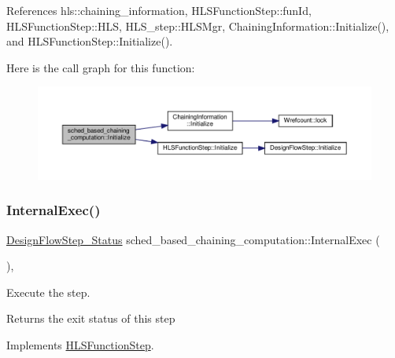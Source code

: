 References hls\+::chaining\+\_\+information, H\+L\+S\+Function\+Step\+::fun\+Id, H\+L\+S\+Function\+Step\+::\+H\+LS, H\+L\+S\+\_\+step\+::\+H\+L\+S\+Mgr, Chaining\+Information\+::\+Initialize(), and H\+L\+S\+Function\+Step\+::\+Initialize().

Here is the call graph for this function\+:
\nopagebreak
\begin{figure}[H]
\begin{center}
\leavevmode
\includegraphics[width=350pt]{d7/d8d/classsched__based__chaining__computation_a86daa9b72e0e2d9a939e80aa22055d4e_cgraph}
\end{center}
\end{figure}
\mbox{\label{classsched__based__chaining__computation_a9318a49e9ae291770e05f12c7dae246c}} 
\subsubsection{\texorpdfstring{Internal\+Exec()}{InternalExec()}}
{\footnotesize\ttfamily \hyperlink{design__flow__step_8hpp_afb1f0d73069c26076b8d31dbc8ebecdf}{Design\+Flow\+Step\+\_\+\+Status} sched\+\_\+based\+\_\+chaining\+\_\+computation\+::\+Internal\+Exec (\begin{DoxyParamCaption}{ }\end{DoxyParamCaption})\hspace{0.3cm}{\ttfamily [override]}, {\ttfamily [virtual]}}



Execute the step. 

\begin{DoxyReturn}{Returns}
the exit status of this step 
\end{DoxyReturn}


Implements \hyperlink{classHLSFunctionStep_a8db4c00d080655984d98143206fc9fa8}{H\+L\+S\+Function\+Step}.



